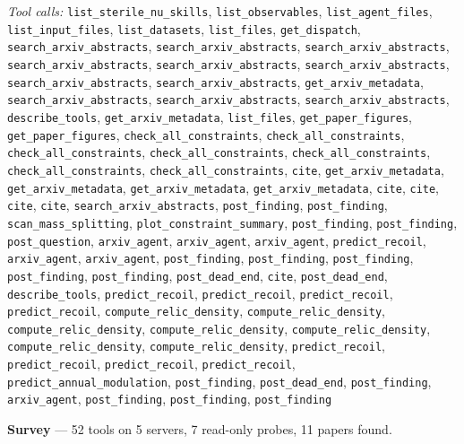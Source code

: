 \documentclass[11pt,a4paper]{article}
\begin{document}
\textit{Tool calls:} \texttt{list\_sterile\_nu\_skills}, \texttt{list\_observables}, \texttt{list\_agent\_files}, \texttt{list\_input\_files}, \texttt{list\_datasets}, \texttt{list\_files}, \texttt{get\_dispatch}, \texttt{search\_arxiv\_abstracts}, \texttt{search\_arxiv\_abstracts}, \texttt{search\_arxiv\_abstracts}, \texttt{search\_arxiv\_abstracts}, \texttt{search\_arxiv\_abstracts}, \texttt{search\_arxiv\_abstracts}, \texttt{search\_arxiv\_abstracts}, \texttt{search\_arxiv\_abstracts}, \texttt{get\_arxiv\_metadata}, \texttt{search\_arxiv\_abstracts}, \texttt{search\_arxiv\_abstracts}, \texttt{search\_arxiv\_abstracts}, \texttt{describe\_tools}, \texttt{get\_arxiv\_metadata}, \texttt{list\_files}, \texttt{get\_paper\_figures}, \texttt{get\_paper\_figures}, \texttt{check\_all\_constraints}, \texttt{check\_all\_constraints}, \texttt{check\_all\_constraints}, \texttt{check\_all\_constraints}, \texttt{check\_all\_constraints}, \texttt{check\_all\_constraints}, \texttt{check\_all\_constraints}, \texttt{cite}, \texttt{get\_arxiv\_metadata}, \texttt{get\_arxiv\_metadata}, \texttt{get\_arxiv\_metadata}, \texttt{get\_arxiv\_metadata}, \texttt{cite}, \texttt{cite}, \texttt{cite}, \texttt{cite}, \texttt{search\_arxiv\_abstracts}, \texttt{post\_finding}, \texttt{post\_finding}, \texttt{scan\_mass\_splitting}, \texttt{plot\_constraint\_summary}, \texttt{post\_finding}, \texttt{post\_finding}, \texttt{post\_question}, \texttt{arxiv\_agent}, \texttt{arxiv\_agent}, \texttt{arxiv\_agent}, \texttt{predict\_recoil}, \texttt{arxiv\_agent}, \texttt{arxiv\_agent}, \texttt{post\_finding}, \texttt{post\_finding}, \texttt{post\_finding}, \texttt{post\_finding}, \texttt{post\_finding}, \texttt{post\_dead\_end}, \texttt{cite}, \texttt{post\_dead\_end}, \texttt{describe\_tools}, \texttt{predict\_recoil}, \texttt{predict\_recoil}, \texttt{predict\_recoil}, \texttt{predict\_recoil}, \texttt{compute\_relic\_density}, \texttt{compute\_relic\_density}, \texttt{compute\_relic\_density}, \texttt{compute\_relic\_density}, \texttt{compute\_relic\_density}, \texttt{compute\_relic\_density}, \texttt{compute\_relic\_density}, \texttt{predict\_recoil}, \texttt{predict\_recoil}, \texttt{predict\_recoil}, \texttt{predict\_recoil}, \texttt{predict\_annual\_modulation}, \texttt{post\_finding}, \texttt{post\_dead\_end}, \texttt{post\_finding}, \texttt{arxiv\_agent}, \texttt{post\_finding}, \texttt{post\_finding}, \texttt{post\_finding}\par
\textbf{Survey} --- 52 tools on 5 servers, 7 read-only probes, 11 papers found.
\end{document}
